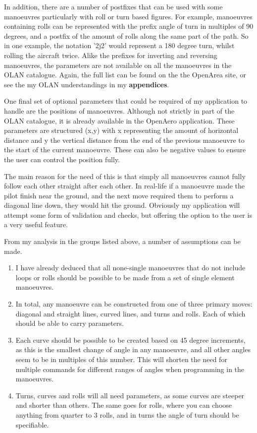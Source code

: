 In addition, there are a number of postfixes that can be used with some manoeuvres particularly with roll or turn based figures. For example, manoeuvres containing rolls can be represented with the prefix angle of turn in multiples of 90 degrees, and a postfix of the amount of rolls along the same part of the path. So in one example, the notation '2j2' would represent a 180 degree turn, whilst rolling the aircraft twice. Alike the prefixes for inverting and reversing manoeuvres, the parameters are not available on all the manoeuvres in the OLAN catalogue. Again, the full list can be found on the the OpenArea site, or see the my OLAN understandings in my \textbf{appendices}.

One final set of optional parameters that could be required of my application to handle are the positions of manoeuvres. Although not strictly in part of the OLAN catalogue, it is already available in the OpenAero application. These parameters are structured (x,y) with x representing the amount of horizontal distance and y the vertical distance from the end of the previous manoeuvre to the start of the current manoeuvre. These can also be negative values to ensure the user can control the position fully. 

The main reason for the need of this is that simply all manoeuvres cannot fully follow each other straight after each other. In real-life if a manoeuvre made the pilot finish near the ground, and the next move required them to perform a diagonal line down, they would hit the ground. Obviously my application will attempt some form of validation and checks, but offering the option to the user is a very useful feature.

From my analysis in the groups listed above, a number of assumptions can be made.
\begin{enumerate}
	\item I have already deduced that all none-single manoeuvres that do not include loops or rolls should be possible to be made from a set of single element manoeuvres.
	\item In total, any manoeuvre can be constructed from one of three primary moves: diagonal and straight lines, curved lines, and turns and rolls. Each of which should be able to carry parameters.
	\item Each curve should be possible to be created based on 45 degree increments, as this is the smallest change of angle in any manoeuvre, and all other angles seem to be in multiples of this number. This will shorten the need for multiple commands for different ranges of angles when programming in the manoeuvres.
	\item Turns, curves and rolls will all need parameters, as some curves are steeper and shorter than others. The same goes for rolls, where you can choose anything from quarter to 3 rolls, and in turns the angle of turn should be specifiable.
\end{enumerate}


